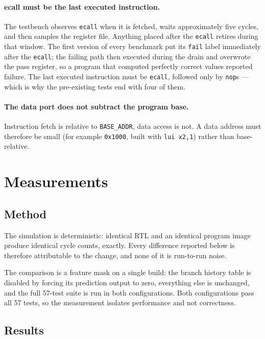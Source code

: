 \documentclass[11pt]{article}
\begin{document}
\paragraph{ecall must be the last executed instruction.} The testbench observes
\texttt{ecall} when it is fetched, waits approximately five cycles, and then samples the
register file. Anything placed after the \texttt{ecall} retires during that window. The
first version of every benchmark put its \texttt{fail} label immediately after the
\texttt{ecall}; the failing path then executed during the drain and overwrote the pass
register, so a program that computed perfectly correct values reported failure. The
last executed instruction must be \texttt{ecall}, followed only by \texttt{nop}s ---
which is why the pre-existing tests end with four of them.

\paragraph{The data port does not subtract the program base.} Instruction fetch is
relative to \texttt{BASE\_ADDR}, data access is not. A data address must therefore be
small (for example \texttt{0x1000}, built with \texttt{lui x2,1}) rather than
base-relative.

\section{Measurements}

\subsection{Method}

The simulation is deterministic: identical RTL and an identical program image produce
identical cycle counts, exactly. Every difference reported below is therefore
attributable to the change, and none of it is run-to-run noise.

The comparison is a feature mask on a single build: the branch history table is disabled
by forcing its prediction output to zero, everything else is unchanged, and the full
57-test suite is run in both configurations. Both configurations pass all 57 tests, so
the measurement isolates performance and not correctness.

\subsection{Results}
\end{document}
